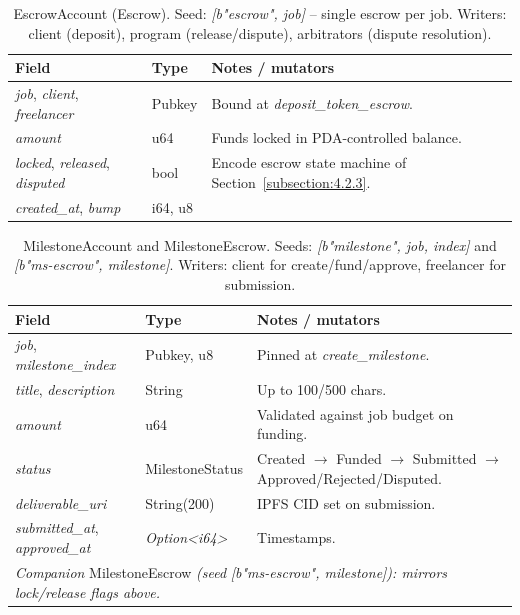 \begin{table}[H]
\centering
\caption{EscrowAccount (Escrow). Seed: \emph{[b"escrow", job]} -- single escrow per job. Writers: client (deposit), program (release/dispute), arbitrators (dispute resolution).}
\label{table:pda_escrow}
\small
\begin{tabular}{|l|l|p{6.5cm}|}
\hline
\textbf{Field} & \textbf{Type} & \textbf{Notes / mutators} \\ \hline
\emph{job}, \emph{client}, \emph{freelancer} & Pubkey & Bound at \emph{deposit\_token\_escrow}. \\ \hline
\emph{amount} & u64 & Funds locked in PDA-controlled balance. \\ \hline
\emph{locked}, \emph{released}, \emph{disputed} & bool & Encode escrow state machine of Section~\ref{subsection:4.2.3}. \\ \hline
\emph{created\_at}, \emph{bump} & i64, u8 & \\ \hline
\end{tabular}
\end{table}

\begin{table}[H]
\centering
\caption{MilestoneAccount and MilestoneEscrow. Seeds: \emph{[b"milestone", job, index]} and \emph{[b"ms-escrow", milestone]}. Writers: client for create/fund/approve, freelancer for submission.}
\label{table:pda_milestone}
\small
\begin{tabular}{|l|l|p{6.5cm}|}
\hline
\textbf{Field} & \textbf{Type} & \textbf{Notes / mutators} \\ \hline
\emph{job}, \emph{milestone\_index} & Pubkey, u8 & Pinned at \emph{create\_milestone}. \\ \hline
\emph{title}, \emph{description} & String & Up to 100/500 chars. \\ \hline
\emph{amount} & u64 & Validated against job budget on funding. \\ \hline
\emph{status} & MilestoneStatus & Created $\to$ Funded $\to$ Submitted $\to$ Approved/Rejected/Disputed. \\ \hline
\emph{deliverable\_uri} & String(200) & IPFS CID set on submission. \\ \hline
\emph{submitted\_at}, \emph{approved\_at} & \emph{Option\textless{}i64\textgreater{}} & Timestamps. \\ \hline
\multicolumn{3}{|l|}{\emph{Companion} MilestoneEscrow \emph{(seed} \emph{[b"ms-escrow", milestone]}\emph{): mirrors lock/release flags above.}} \\ \hline
\end{tabular}
\end{table}

